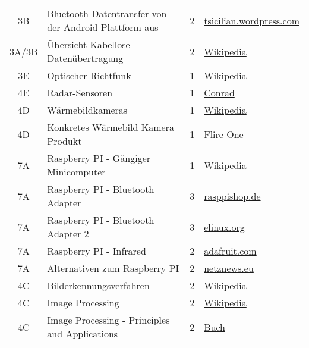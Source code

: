 \begin{longtable}{c l c l}
        	3B 
			& Bluetooth Datentransfer von der Android Plattform aus 
			& 2 
			& \href{http://tsicilian.wordpress.com/2012/11/06/bluetooth-data-transfer-with-android/}{tsicilian.wordpress.com} \\
        	3A/3B 
			& Übersicht Kabellose Datenübertragung 
			& 2 
			& \href{http://de.wikipedia.org/w/index.php?title=Kabellose_\%C3\%9Cbertragungsverfahren&redirect=no}{Wikipedia} \\
        	3E 
			& Optischer Richtfunk 
			& 1 
			& \href{http://de.wikipedia.org/wiki/Optischer_Richtfunk}{Wikipedia} \\
        	4E 	
			& Radar-Sensoren 
			& 1 
			& \href{http://www.conrad.ch/ce/de/overview/0231510/Radar-Sensoren}{Conrad} \\
        	4D 	
			& Wärmebildkameras 
			& 1 
			& \href{http://de.wikipedia.org/wiki/W\%C3\%A4rmebildkamera}{Wikipedia} \\
        	4D 
			& Konkretes Wärmebild Kamera Produkt 
			& 1 
			& \href{http://www.mobilefun.co.uk/flir-one-personal-thermal-imaging-case-for-iphone-5-5s-p43472.htm}{Flire-One} \\
        	7A 
			& Raspberry PI - Gängiger Minicomputer 
			& 1 
			& \href{http://de.wikipedia.org/wiki/Raspberry_Pi}{Wikipedia} \\
        	7A 
			& Raspberry PI - Bluetooth Adapter 
			& 3 
			& \href{http://www.rasppishop.de/raspberry-pi-welt/netzwerk/w-lan/149/bluetooth-dongle-v2.0-adapter-fuer-raspberry-pi}{rasppishop.de} \\
        	7A 
			& Raspberry PI - Bluetooth Adapter 2 
			& 3 
			& \href{http://elinux.org/RPi_USB_Bluetooth_adapters}{elinux.org} \\
        	7A 
			& Raspberry PI - Infrared 
			& 2 
			& \href{https://learn.adafruit.com/using-an-ir-remote-with-a-raspberry-pi-media-center/overview}{adafruit.com} \\
        	7A 
			& Alternativen zum Raspberry PI 
			& 2 
			& \href{http://www.netznews.eu/10-raspberry-pi-alternativen-im-kurzportraet/}{netznews.eu} \\
        	4C 
			& Bilderkennungsverfahren 
			& 2 
			& \href{http://en.wikipedia.org/wiki/Outline_of_object_recognition}{Wikipedia} \\
        	4C 
			& Image Processing 
			& 2 
			& \href{http://en.wikipedia.org/wiki/Image_processing}{Wikipedia} \\
        	4C 
			& Image Processing - Principles and Applications 
			& 2 
			& \href{http://books.google.co.in/books?id=smBw4-xvfrIC&lpg=PP1&dq=image\%20processing\%20ajoy\%20ray&pg=PP1#v=onepage&q=&f=false}{Buch} \\

\end{longtable}
